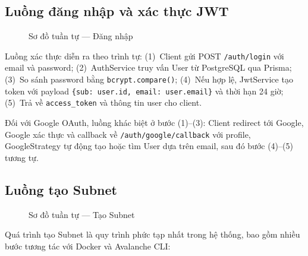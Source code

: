 \subsection{Luồng đăng nhập và xác thực JWT}

\begin{figure}[H]
\centering
{}
\caption{Sơ đồ tuần tự --- Đăng nhập}
\label{fig:seq_login}
\end{figure}

Luồng xác thực diễn ra theo trình tự: (1)~Client gửi POST \texttt{/auth/login} với email và password; (2)~AuthService truy vấn User từ PostgreSQL qua Prisma; (3)~So sánh password bằng \texttt{bcrypt.compare()}; (4)~Nếu hợp lệ, JwtService tạo token với payload \texttt{\{sub: user.id, email: user.email\}} và thời hạn 24 giờ; (5)~Trả về \texttt{access\_token} và thông tin user cho client.

Đối với Google OAuth, luồng khác biệt ở bước (1)--(3): Client redirect tới Google, Google xác thực và callback về \texttt{/auth/google/callback} với profile, GoogleStrategy tự động tạo hoặc tìm User dựa trên email, sau đó bước (4)--(5) tương tự.

\subsection{Luồng tạo Subnet}

\begin{figure}[H]
\centering
{}
\caption{Sơ đồ tuần tự --- Tạo Subnet}
\label{fig:seq_create_subnet}
\end{figure}

Quá trình tạo Subnet là quy trình phức tạp nhất trong hệ thống, bao gồm nhiều bước tương tác với Docker và Avalanche CLI:

